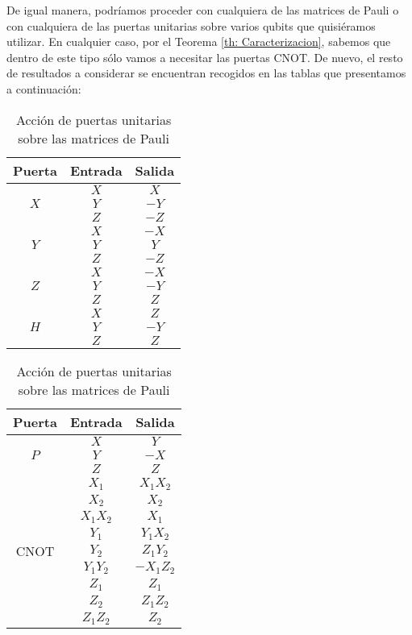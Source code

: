 \documentclass[11pt,a4paper,twoside,pdf]{article}
\numberwithin{equation}{section}
\begin{document}
		De igual manera, podríamos proceder con cualquiera de las matrices de Pauli o con cualquiera de las puertas unitarias sobre varios qubits que quisiéramos utilizar. En cualquier caso, por el Teorema \ref{th: Caracterizacion}, sabemos que dentro de este tipo sólo vamos a necesitar las puertas CNOT. De nuevo, el resto de resultados a considerar se encuentran recogidos en las tablas que presentamos a continuación:
			
			\begin{table}[h]
				\centering
					\begin{tabular}{| c | c | c | }
						\hline
							Puerta & Entrada & Salida \\ 						\hline
							\multirow{3}{*}{$X$}	& $X$ & $X$ \\
																& $Y$ & $-Y$ \\
																& $Z$ & $-Z$  \\	\hline
							\multirow{3}{*}{$Y$}	& $X$ & $-X$ \\
																& $Y$ & $Y$	\\
																& $Z$ & $-Z$ \\		\hline
							\multirow{3}{*}{$Z$}	& $X$ & $-X$ \\
																& $Y$ & $-Y$ \\
																& $Z$ & $Z$ \\		\hline	
							\multirow{3}{*}{$H$}	& $X$ & $Z$ \\
																& $Y$ & $-Y$ \\
																& $Z$ & $Z$ \\ 		\hline												
					\end{tabular}		
				\qquad
					\begin{tabular}{| c | c | c | }
						\hline
							Puerta & Entrada & Salida \\ 						\hline
							\multirow{3}{*}{$P$}	& $X$ & $Y$ \\
																& $Y$ & $-X$ \\
																& $Z$ & $Z$  \\	\hline
							\multirow{9}{*}{CNOT} 	 & $X_1$ & $X_1X_2$ \\ 
																	& $X_2$ & $X_2$ \\ 
																	& $X_1X_2$ & $X_1$ \\ \cline{2-3} 
																	& $Y_1$ & $Y_1X_2$ \\  
																	& $Y_2$ & $Z_1Y_2$ \\ 
																	& $Y_1Y_2$ & $-X_1Z_2$ \\ \cline{2-3} 
																	& $Z_1$ & $Z_1$ \\ 
																	& $Z_2$ & $Z_1Z_2$ \\ 
																	& $Z_1Z_2$ & $Z_2$ \\ \hline																						
					\end{tabular}	
				\caption{Acción de puertas unitarias sobre las matrices de Pauli}
				\label{tab: Estabilizadores Pauli}
			\end{table}		
	
\end{document}
